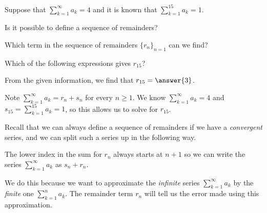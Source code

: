 \documentclass{ximera}
\author{Jim Talamo}
\begin{document}
\begin{exercise}

Suppose that $\sum_{k=1}^{\infty} a_k =4$ and it is known that $\sum_{k=1}^{15} a_k =1$.  

Is it possible to define a sequence of remainders?
\begin{multipleChoice}
\end{multipleChoice}

Which term in the sequence of remainders $\{r_n\}_{n=1}$ can we find?

\begin{multipleChoice}
\end{multipleChoice}

\begin{exercise}

Which of the following expressions gives $r_{15}$?
\begin{multipleChoice}
\end{multipleChoice}

From the given information, we find that $r_{15} = \answer{3}$.

\begin{hint}
Note $\sum_{k=1}^{\infty} a_k = r_n+s_n$ for every $n\geq 1$. We know $\sum_{k=1}^{\infty} a_k= 4$ and $s_{15} = \sum_{k=1}^{15} a_k =1$, so this allows us to solve for $r_{15}$.

\end{hint}
\begin{feedback}
Recall that we can always define a sequence of remainders if we have a \emph{convergent} series, and we can split such a series up in the following way.

\begin{image}
  \end{image}
  
  The lower index in the sum for $r_n$ always starts at $n+1$ so we can write the series $ \sum_{k=1}^{\infty} a_k$ as $s_n +r_n$.
  
  We do this because we want to approximate the \emph{infinite} series $\sum_{k=1}^{\infty} a_k$ by the \emph{finite} one $ \sum_{k=1}^{n} a_k$.  The remainder term $r_n$ will tell us the error made using this approximation.
\end{feedback}


\end{exercise}

\end{exercise}
\end{document}
